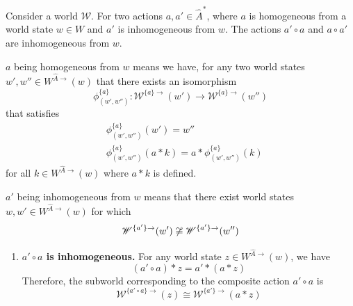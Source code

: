 
\begin{propositionE}
    \label{prp:homogeneous_and_inhomogeneous_gives_inhomogeneous}
    Consider a world $\mathscr{W}$.
    For two actions $a, a' \in \hat{A}^{*}$, where $a$ is homogeneous from a world state $w \in W$ and $a'$ is inhomogeneous from $w$.
    The actions $a' \circ a$ and $a \circ a'$ are inhomogeneous from $w$.
\end{propositionE}
\begin{proofE}
        $a$ being homogeneous from $w$ means we have, for any two world states $w', w'' \in W^{\hat{A}\to}(w)$ that there exists an isomorphism
        \begin{equation}
            \phi^{\{a\}}_{(w',w'')}: \mathscr{W}^{\{a\}\to}(w') \to \mathscr{W}^{\{a\}\to}(w'')
        \end{equation}
        that satisfies
        \begin{align}
            & \phi^{\{a\}}_{(w',w'')}(w') = w'' \\
            & \phi^{\{a\}}_{(w',w'')}(a \ast k) = a \ast \phi^{\{a\}}_{(w',w'')}(k)
        \end{align}
        for all $k \in W^{\hat{A}\to}(w)$ where $a \ast k$ is defined.

    $a'$ being inhomogeneous from $w$ means that there exist world states $w, w' \in W^{\hat{A}\to}(w)$ for which
    \begin{equation}
        \mathscr{W}^{\{a'\}\to}(w') \centernot\cong \mathscr{W}^{\{a'\}\to}(w'')
    \end{equation}

\begin{enumerate}
    \item \textbf{$a' \circ a$ is inhomogeneous.}
    For any world state $z \in W^{\hat{A}\to}(w)$, we have
    \begin{equation}
        (a' \circ a) \ast z = a' \ast (a \ast z)
    \end{equation}
    Therefore, the subworld corresponding to the composite action $a' \circ a$ is
    \begin{equation}\label{eqn:homogeneous_and_inhomogeneous_gives_inhomogeneous_1}
        \mathscr{W}^{\{a' \circ a\}\to}(z) \cong \mathscr{W}^{\{a'\}\to}(a \ast z)
    \end{equation}


\end{enumerate}
\end{proofE}
